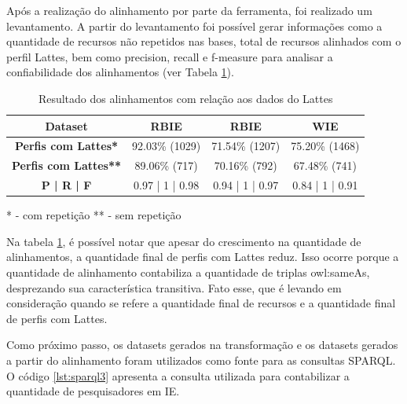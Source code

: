 Após a realização do alinhamento por parte da ferramenta, foi realizado um levantamento. A partir do levantamento foi possível gerar informações como a quantidade de recursos não repetidos nas bases, total de recursos alinhados com o perfil Lattes, bem como precision, recall e f-measure \cite{goutte2005probabilistic} para analisar a confiabilidade dos alinhamentos (ver Tabela \ref{tab:case_study}).

\begin{table}[!ht]
\centering
\caption{ Resultado dos alinhamentos com relação aos dados do Lattes}
\label{tab:case_study}
\begin{tabular}{|c|c|c|c|}
\hline
\textbf{Dataset}	&	\textbf{RBIE}	&	\textbf{RBIE}	&	\textbf{WIE}  \\ \hline
\textbf{Perfis com Lattes*}	&	92.03\% (1029)	&	71.54\% (1207)	&	75.20\% (1468) \\ \hline
\textbf{Perfis com Lattes**}	&	89.06\% (717)	&	70.16\% (792)	&	67.48\% (741) \\ \hline
\textbf{P | R | F}	&	0.97 | 1 | 0.98	&	0.94 | 1 | 0.97 	&	0.84 | 1 | 0.91 \\ \hline
\end{tabular}
\end{table}
* - com repetição
** - sem repetição

Na tabela \ref{tab:case_study}, é possível notar que apesar do crescimento na quantidade de alinhamentos, a quantidade final de perfis com Lattes reduz. Isso ocorre porque a quantidade de alinhamento contabiliza a quantidade de triplas owl:sameAs, desprezando sua característica transitiva. Fato esse, que é levando em consideração quando se refere a quantidade final de recursos e a quantidade final de perfis com Lattes.

Como próximo passo, os datasets gerados na transformação e os datasets gerados a partir do alinhamento foram utilizados como fonte para as consultas SPARQL. O código \ref{lst:sparql3} apresenta a consulta utilizada para contabilizar a quantidade de pesquisadores em IE. 

